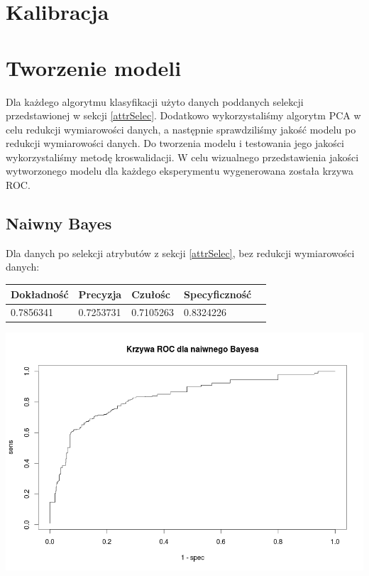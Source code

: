 \documentclass{article}
\begin{document}
\section{Kalibracja}
\section{Tworzenie modeli}

Dla każdego algorytmu klasyfikacji użyto danych poddanych selekcji przedstawionej w sekcji \ref{attrSelec}. Dodatkowo wykorzystaliśmy algorytm PCA w celu redukcji wymiarowości danych, a następnie sprawdziliśmy jakość modelu po redukcji wymiarowości danych. Do tworzenia modelu i testowania jego jakości wykorzystaliśmy metodę kroswalidacji. W celu wizualnego przedstawienia jakości wytworzonego modelu dla każdego eksperymentu wygenerowana została krzywa ROC. 

\subsection{Naiwny Bayes}

Dla danych po selekcji atrybutów z sekcji \ref{attrSelec}, bez redukcji wymiarowości danych:

\begin{center}
    \begin{tabular}{| l | l | l | l | l|}
    \hline
        Dokładność &  Precyzja &  Czułośc & Specyficzność \\ \hline
      	0.7856341 & 0.7253731 & 0.7105263 & 0.8324226  \\
    \hline
    \end{tabular}
\end{center}

\begin{center}
	\includegraphics[scale=0.40]{images/bayesNoPCA.png}
\end{center}
\end{document}
